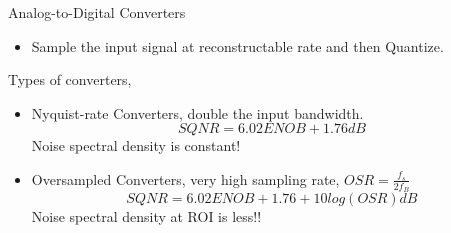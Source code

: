 \documentclass{beamer}
\begin{document}
\begin{frame}{Analog-to-Digital Converters}
	\begin{itemize}
		\item Sample the input signal at reconstructable rate and then Quantize.
		\pause
	\end{itemize}
	Types of converters,
	\pause
	\begin{itemize}
	\pause
		\item Nyquist-rate Converters, double the input bandwidth.
		\begin{equation*}
			SQNR = 6.02ENOB + 1.76 dB
		\end{equation*}
		\pause
		Noise spectral density is constant!
		\pause		
		\item Oversampled Converters, very high sampling rate, $OSR = \frac{f_s}{2f_B}$
		\begin{equation*}
			SQNR = 6.02ENOB + 1.76 + 10log(OSR)dB
		\end{equation*}
		\pause
		Noise spectral density at ROI is less!!
	\end{itemize}
\end{frame}
\end{document}
